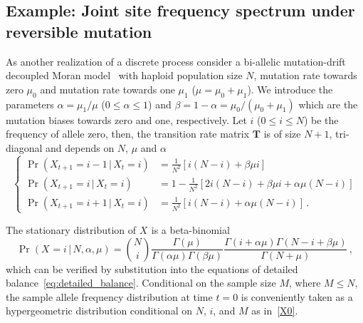 \documentclass[preprint]{elsarticle}
\newcommand\given{{\,|\,}}
\newcommand\x[1]{\ensuremath{X_{#1}}}
\begin{document}
\subsection{Example: Joint site frequency spectrum under reversible mutation}\label{section:discr_rev_general}
As another realization of a discrete process consider a bi-allelic mutation-drift decoupled Moran model~\citep{Baak08,Ethe09} with haploid population size $N$, mutation rate towards zero $\mu_0$ and mutation rate towards one $\mu_1$ ($\mu=\mu_0+\mu_1$).  We introduce the parameters $\alpha=\mu_1/\mu$ ($0 \leq \alpha \leq 1$) and $\beta=1-\alpha=\mu_0/(\mu_0+\mu_1)$ which are the mutation biases towards zero and one, respectively.  Let $i$ ($0\leq i\leq N$) be the frequency of allele zero, then, the transition rate matrix $\mathbf{T}$ is of size $N+1$, tri-diagonal and depends on $N$, $\mu$ and $\alpha$
\begin{equation}\label{eq:transition_decoupled_Moran}
\begin{cases}
\Pr(\x{t+1}=i-1\given \x{t}=i)&=\frac1{N^2}\left[i(N-i)+\beta\mu i\right]\\
    \Pr(\x{t+1}=i\given \x{t}=i)&=1-\frac1{N^2}\left[2i(N-i)+\beta\mu i + \alpha\mu (N-i) \right]\\
\Pr(\x{t+1}=i+1\given \x{t}=i)&=\frac1{N^2}\left[i(N-i)+\alpha\mu (N-i)\right]\,.
\end{cases}
\end{equation}

The stationary distribution of $\x{}$ is a beta-binomial
\begin{equation}\label{beta_bin}
\Pr(\x{}=i\given N,\alpha,\mu)=\binom{N}{i}
\frac{\Gamma(\mu)}{\Gamma(\alpha\mu)\Gamma(\beta\mu)}
\frac{\Gamma(i+\alpha\mu)\Gamma(N-i+\beta\mu)}{\Gamma(N+\mu)}\,,
\end{equation}
which can be verified by substitution into the equations of detailed balance~\eqref{eq:detailed_balance}. 
Conditional on the sample size $M$, where $M\leq N$, the sample allele frequency distribution at time $t=0$ is conveniently taken as a hypergeometric distribution conditional on $N$, $i$, and $M$ as in~\eqref{X0}.

\end{document}
